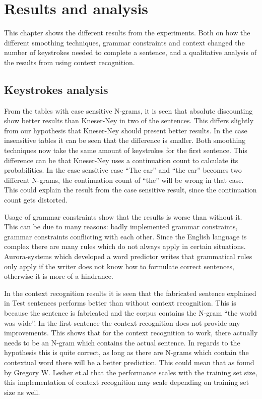 \section{Results and analysis}
This chapter shows the different results from the experiments. Both on how the different smoothing techniques, grammar constraints and context changed the number of keystrokes needed to complete a sentence, and a qualitative analysis of the results from using context recognition.

\subsection{Keystrokes analysis}
From the tables with case sensitive N-grams, it is seen that absolute discounting show better results than Kneser-Ney in two of the sentences. This differs slightly from our hypothesis that Kneser-Ney should present better results. In the case insensitive tables it can be seen that the difference is smaller. Both smoothing techniques now take the same amount of keystrokes for the first sentence. This difference can be that Kneser-Ney uses a continuation count to calculate its probabilities. In the case sensitive case “The car” and “the car” becomes two different N-grams, the continuation count of “the” will be wrong in that case. This could explain the result from the case sensitive result, since the continuation count gets distorted. 

Usage of grammar constraints show that the results is worse than without it. This can be due to many reasons: badly implemented grammar constraints, grammar constraints conflicting with each other. Since the English language is complex there are many rules which do not always apply in certain situations. Aurora-systems which developed a word predictor writes that grammatical rules only apply if the writer does not know how to formulate correct sentences, otherwise it is more of a hindrance\cite{aurora}.

In the context recognition results it is seen that the fabricated sentence explained in Test sentences performs better than without context recognition. This is because the sentence is fabricated and the corpus contains the N-gram “the world was wide”. In the first sentence the context recognition does not provide any improvements. This shows that for the context recognition to work, there actually needs to be an N-gram which contains the actual sentence. In regards to the hypothesis this is quite correct, as long as there are N-grams which contain the contextual word there will be a better prediction. This could mean that as found by Gregory W. Lesher et.al that the performance scales with the training set size\cite{Lesher99effectsof}, this implementation of context recognition may scale depending on training set size as well.
\vspace{1em}
